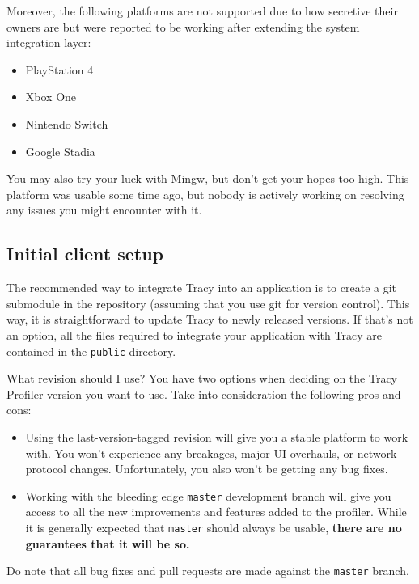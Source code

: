 \documentclass[hidelinks,titlepage,a4paper,twoside]{article}
\begin{document}
Moreover, the following platforms are not supported due to how secretive their owners are but were reported to be working after extending the system integration layer:

\begin{itemize}
\item PlayStation 4
\item Xbox One
\item Nintendo Switch
\item Google Stadia
\end{itemize}

You may also try your luck with Mingw, but don't get your hopes too high. This platform was usable some time ago, but nobody is actively working on resolving any issues you might encounter with it.

\subsection{Initial client setup}
\label{initialsetup}

The recommended way to integrate Tracy into an application is to create a git submodule in the repository (assuming that you use git for version control). This way, it is straightforward to update Tracy to newly released versions. If that's not an option, all the files required to integrate your application with Tracy are contained in the \texttt{public} directory.

\begin{bclogo}[
noborder=true,
couleur=black!5,
logo=\bclampe
]{What revision should I use?}
You have two options when deciding on the Tracy Profiler version you want to use. Take into consideration the following pros and cons:

\begin{itemize}
\item Using the last-version-tagged revision will give you a stable platform to work with. You won't experience any breakages, major UI overhauls, or network protocol changes. Unfortunately, you also won't be getting any bug fixes.
\item Working with the bleeding edge \texttt{master} development branch will give you access to all the new improvements and features added to the profiler. While it is generally expected that \texttt{master} should always be usable, \textbf{there are no guarantees that it will be so.}
\end{itemize}

Do note that all bug fixes and pull requests are made against the \texttt{master} branch.
\end{bclogo}
\end{document}
